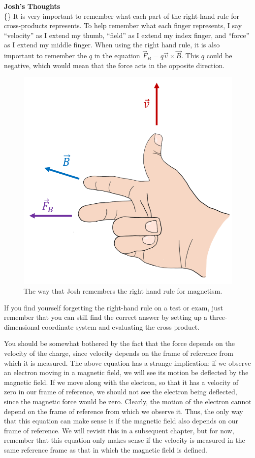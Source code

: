 \begin{framed}
\textbf{Josh's Thoughts}\\
\{\}
It is very important to remember what each part of the right-hand rule for cross-products represents. To help remember what each finger represents, I say ``velocity'' as I extend my thumb, ``field'' as I extend my index finger, and ``force'' as I extend my middle finger. When using the right hand rule, it is also important to remember the $q$ in the equation $\vec F_B = q\vec v \times \vec B$. This $q$ could be negative, which would mean that the force acts in the opposite direction.

\begin{figure}[!htbp]
\centering
\includegraphics[width=0.4\linewidth]{files/rhr-0a145067c9b8e339abb2d3735e257d33.png}
\caption[]{The way that Josh remembers the right hand rule for magnetism.}
\label{fig:magneticforce:rhr}
\end{figure}

If you find yourself forgetting the right-hand rule on a test or exam, just remember that you can still find the correct answer by setting up a three-dimensional coordinate system and evaluating the cross product.
\end{framed}

You should be somewhat bothered by the fact that the force depends on the velocity of the charge, since velocity depends on the frame of reference from which it is measured. The above equation has a strange implication: if we observe an electron moving in a magnetic field, we will see its motion be deflected by the magnetic field. If we move along with the electron, so that it has a velocity of zero in our frame of reference, we should not see the electron being deflected, since the magnetic force would be zero. Clearly, the motion of the electron cannot depend on the frame of reference from which we observe it. Thus, the only way that this equation can make sense is if the magnetic field also depends on our frame of reference. We will revisit this in a subsequent chapter, but for now, remember that this equation only makes sense if the velocity is measured in the same reference frame as that in which the magnetic field is defined.

